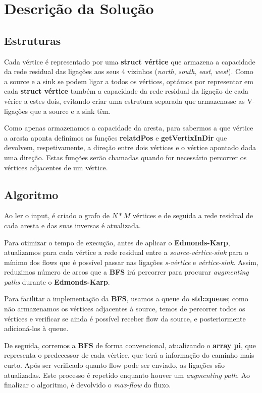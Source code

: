 \documentclass[12pt,a4paper]{article}
\begin{document}
\section{Descrição da Solução}
\subsection{Estruturas}
Cada vértice é representado por uma \textbf{struct vértice} que armazena a capacidade da rede residual das ligações aos seus
4 vizinhos (\textit{north}, \textit{south}, \textit{east}, \textit{west}). Como a source e a sink se podem ligar a todos os vértices,
optámos por representar
em cada \textbf{struct vértice} também a capacidade da rede residual da ligação de cada vérice a estes dois, evitando criar
uma estrutura separada que armazenasse as V-ligações que a source e a sink têm.

Como apenas armazenamos a capacidade da aresta, para sabermos a que vértice a aresta aponta definimos as funções
\textbf{relatdPos} e \textbf{getVertixInDir} que devolvem, respetivamente, a direção entre dois vértices e o vértice apontado
dada uma direção. Estas funções serão chamadas quando for necessário percorrer os vértices adjacentes de um vértice.

\subsection{Algoritmo}
Ao ler o input, é criado o grafo de $N*M$ vértices e de seguida a rede residual de cada aresta e das suas inversas é atualizada.

Para otimizar o tempo de execução, antes de aplicar o \textbf{Edmonds-Karp}, atualizamos para cada vértice a rede residual entre a
\textit{source-vértice-sink} para o mínimo dos flows que é possível passar nas ligações \textit{s-vértice} e \textit{vértice-sink}.
Assim, reduzimos número de arcos que a \textbf{BFS} irá percorrer para procurar \textit{augmenting paths} durante o \textbf{Edmonds-Karp}.

Para facilitar a implementação da \textbf{BFS}, usamos a queue do \textbf{std::queue}; como não armazenamos os vértices adjacentes à source,
temos de percorrer todos os vértices e verificar se ainda é possível receber flow da source, e posteriormente adicioná-los
à queue.

De seguida, corremos a \textbf{BFS} de forma convencional, atualizando o \textbf{array pi}, que representa o predecessor
de cada vértice, que terá a informação do caminho mais curto. Após ser verificado quanto flow pode ser enviado, as ligações
são atualizadas. Este processo é repetido enquanto houver um \textit{augmenting path}. Ao finalizar o algoritmo, é devolvido o \textit{max-flow} do fluxo.
\end{document}
